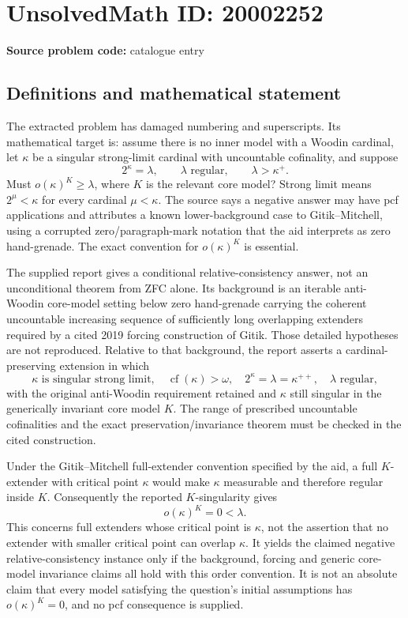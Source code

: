 \documentclass[11pt]{article}
\begin{document}
\section*{UnsolvedMath ID: 20002252}
\textbf{Source problem code:} catalogue entry
\subsection{Definitions and mathematical statement}
The extracted problem has damaged numbering and superscripts. Its mathematical target is: assume there is no inner model with a Woodin cardinal, let \(\kappa\) be a singular strong-limit cardinal with uncountable cofinality, and suppose
\[
 2^\kappa=\lambda,\qquad \lambda\text{ regular},\qquad\lambda>\kappa^+.
\]
Must \(o(\kappa)^K\geq\lambda\), where \(K\) is the relevant core model? Strong limit means \(2^\mu<\kappa\) for every cardinal \(\mu<\kappa\). The source says a negative answer may have pcf applications and attributes a known lower-background case to Gitik--Mitchell, using a corrupted zero/paragraph-mark notation that the aid interprets as zero hand-grenade. The exact convention for \(o(\kappa)^K\) is essential.

The supplied report gives a conditional relative-consistency answer, not an unconditional theorem from ZFC alone. Its background is an iterable anti-Woodin core-model setting below zero hand-grenade carrying the coherent uncountable increasing sequence of sufficiently long overlapping extenders required by a cited 2019 forcing construction of Gitik. Those detailed hypotheses are not reproduced. Relative to that background, the report asserts a cardinal-preserving extension in which
\[
 \kappa\text{ is singular strong limit},\quad
 \operatorname{cf}(\kappa)>\omega,\quad
 2^\kappa=\lambda=\kappa^{++},\quad\lambda\text{ regular},
\]
with the original anti-Woodin requirement retained and \(\kappa\) still singular in the generically invariant core model \(K\). The range of prescribed uncountable cofinalities and the exact preservation/invariance theorem must be checked in the cited construction.

Under the Gitik--Mitchell full-extender convention specified by the aid, a full \(K\)-extender with critical point \(\kappa\) would make \(\kappa\) measurable and therefore regular inside \(K\). Consequently the reported \(K\)-singularity gives
\[
 o(\kappa)^K=0<\lambda.
\]
This concerns full extenders whose critical point is \(\kappa\), not the assertion that no extender with smaller critical point can overlap \(\kappa\). It yields the claimed negative relative-consistency instance only if the background, forcing and generic core-model invariance claims all hold with this order convention. It is not an absolute claim that every model satisfying the question's initial assumptions has \(o(\kappa)^K=0\), and no pcf consequence is supplied.
\end{document}
